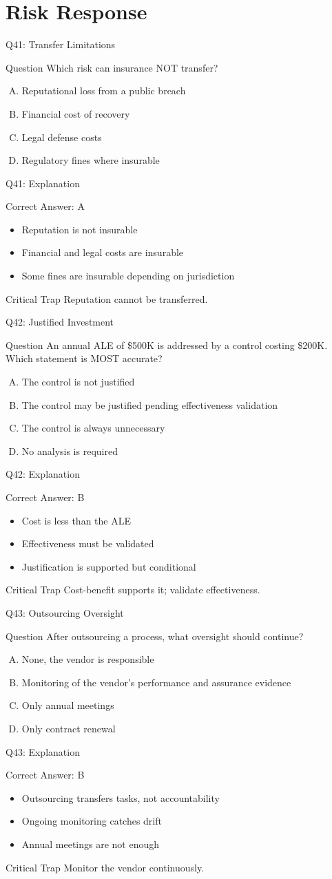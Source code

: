\documentclass[aspectratio=169]{beamer}
\newcommand{\hq}[7]{%
	\begin{frame}{Q#1: #2}
		\begin{block}{Question}
			#3
		\end{block}
		\begin{enumerate}[(A)]
			#4
		\end{enumerate}
	\end{frame}
	\begin{frame}{Q#1: Explanation}
		\begin{block}{Correct Answer: #5}
			\begin{itemize}
				#6
			\end{itemize}
		\end{block}
		\begin{alertblock}{Critical Trap}
			#7
		\end{alertblock}
	\end{frame}
}
\begin{document}
	\section{Risk Response}
	
	\hq{41}{Transfer Limitations}
	{Which risk can insurance NOT transfer?}
	{\item Reputational loss from a public breach
		\item Financial cost of recovery
		\item Legal defense costs
		\item Regulatory fines where insurable}
	{A}
	{\item Reputation is not insurable
		\item Financial and legal costs are insurable
		\item Some fines are insurable depending on jurisdiction}
	{Reputation cannot be transferred.}
	
	\hq{42}{Justified Investment}
	{An annual ALE of \$500K is addressed by a control costing \$200K. Which statement is MOST accurate?}
	{\item The control is not justified
		\item The control may be justified pending effectiveness validation
		\item The control is always unnecessary
		\item No analysis is required}
	{B}
	{\item Cost is less than the ALE
		\item Effectiveness must be validated
		\item Justification is supported but conditional}
	{Cost-benefit supports it; validate effectiveness.}
	
	\hq{43}{Outsourcing Oversight}
	{After outsourcing a process, what oversight should continue?}
	{\item None, the vendor is responsible
		\item Monitoring of the vendor’s performance and assurance evidence
		\item Only annual meetings
		\item Only contract renewal}
	{B}
	{\item Outsourcing transfers tasks, not accountability
		\item Ongoing monitoring catches drift
		\item Annual meetings are not enough}
	{Monitor the vendor continuously.}
	
\end{document}
